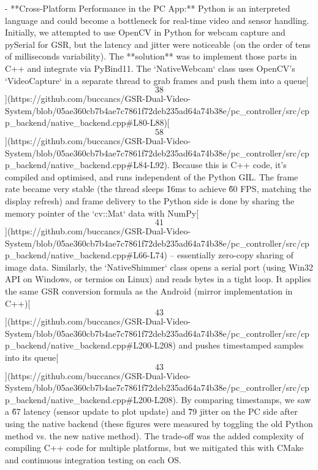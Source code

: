 \documentclass[12pt,a4paper]{article}
\begin{document}
{- **Cross-Platform Performance in the PC App:** Python is an interpreted
  language and could become a bottleneck for real-time video and sensor
  handling. Initially, we attempted to use OpenCV in Python for webcam
  capture and pySerial for GSR, but the latency and jitter were
  noticeable (on the order of tens of milliseconds variability). The
  **solution** was to implement those parts in C++ and integrate via
  PyBind11. The `NativeWebcam` class uses OpenCV's `VideoCapture` in a
  separate thread to grab frames and push them into a
  queue[\[38\]](https://github.com/buccancs/GSR-Dual-Video-System/blob/05ae360cb7b4ae7c7861f72deb235ad64a74b38e/pc_controller/src/cpp_backend/native_backend.cpp#L80-L88)[\[58\]](https://github.com/buccancs/GSR-Dual-Video-System/blob/05ae360cb7b4ae7c7861f72deb235ad64a74b38e/pc_controller/src/cpp_backend/native_backend.cpp#L84-L92).
  Because this is C++ code, it's compiled and optimised, and runs
  independent of the Python GIL. The frame rate became very stable (the
  thread sleeps \~16ms to achieve \~60 FPS, matching the display
  refresh) and frame delivery to the Python side is done by sharing the
  memory pointer of the `cv::Mat` data with
  NumPy[\[41\]](https://github.com/buccancs/GSR-Dual-Video-System/blob/05ae360cb7b4ae7c7861f72deb235ad64a74b38e/pc_controller/src/cpp_backend/native_backend.cpp#L66-L74)
  -- essentially zero-copy sharing of image data. Similarly, the
  `NativeShimmer` class opens a serial port (using Win32 API on Windows,
  or termios on Linux) and reads bytes in a tight loop. It applies the
  same GSR conversion formula as the Android (mirror implementation in
  C++)[\[43\]](https://github.com/buccancs/GSR-Dual-Video-System/blob/05ae360cb7b4ae7c7861f72deb235ad64a74b38e/pc_controller/src/cpp_backend/native_backend.cpp#L200-L208)
  and pushes timestamped samples into its
  queue[\[43\]](https://github.com/buccancs/GSR-Dual-Video-System/blob/05ae360cb7b4ae7c7861f72deb235ad64a74b38e/pc_controller/src/cpp_backend/native_backend.cpp#L200-L208).
  By comparing timestamps, we saw a \~67%
  latency (sensor update to plot update) and \~79%
  jitter on the PC side after using the native backend (these figures
  were measured by toggling the old Python method vs. the new native
  method). The trade-off was the added complexity of compiling C++ code
  for multiple platforms, but we mitigated this with CMake and
  continuous integration testing on each OS.

}
\end{document}
